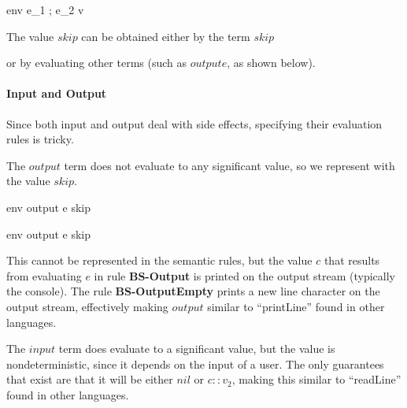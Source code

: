 \documentclass{article}
\begin{document}
	{\mbox{env} \vdash e_1 \; ; \; e_2 \Downarrow v}
	
The value $skip$ can be obtained either by the term $skip$

	
or by evaluating other terms (such as $output e$, as shown below).

\paragraph{Input and Output}
Since both input and output deal with side effects, specifying their evaluation rules is tricky.

The $output$ term does not evaluate to any significant value, so we represent with the value $skip$.

	{\mbox{env} \vdash output \; e \Downarrow skip}
	
	{\mbox{env} \vdash output \; e \Downarrow skip}

This cannot be represented in the semantic rules, but the value $c$ that results from evaluating $e$ in rule \textbf{BS-Output} is printed on the output stream (typically the console).
The rule \textbf{BS-OutputEmpty} prints a new line character on the output stream, effectively making $output$ similar to "`printLine"' found in other languages.

The $input$ term does evaluate to a significant value, but the value is nondeterministic, since it depends on the input of a user.
The only guarantees that exist are that it will be either $nil$ or $c :: v_2$, making this similar to "`readLine"' found in other languages.



	
\end{document}
